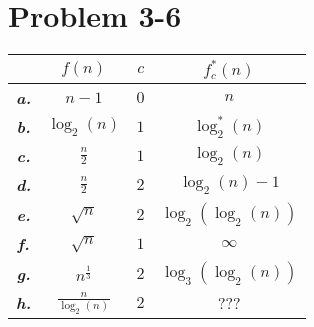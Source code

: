 \documentclass{article}
\begin{document}
\section*{Problem 3-6}

\noindent\begin{center}\begin{tabular}{c|c c|c}
	& $f(n)$ & $c$ & $f_c^*(n)$ \\ \hline
	\textbf{\textit{a.}} & $n - 1$ & $0$ & $n$ \\
	\textbf{\textit{b.}} & $\log_2(n)$ & $1$ & $\log_2^*(n)$ \\
	\textbf{\textit{c.}} & $\frac{n}{2}$ & $1$ & $\log_2(n)$ \\
	\textbf{\textit{d.}} & $\frac{n}{2}$ & $2$ & $\log_2(n) - 1$ \\
	\textbf{\textit{e.}} & $\sqrt{n}$ & $2$ & $\log_2(\log_2(n))$ \\
	\textbf{\textit{f.}} & $\sqrt{n}$ & $1$ & $\infty$ \\
	\textbf{\textit{g.}} & $n^{\frac{1}{3}}$ & $2$ & $\log_3(\log_2(n))$ \\
	\textbf{\textit{h.}} & $\frac{n}{\log_2(n)}$ & $2$ & ??? \\
\end{tabular}
\end{center}
\end{document}
